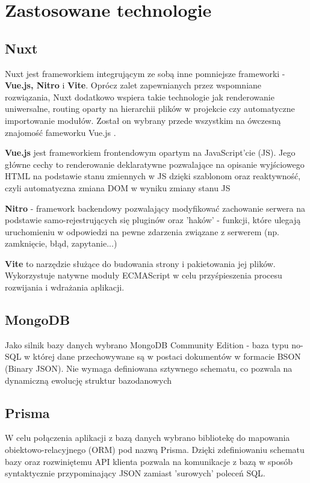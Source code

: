 \section{Zastosowane technologie}

\subsection{Nuxt}
Nuxt jest frameworkiem integrującym ze sobą inne pomniejsze frameworki - \textbf{Vue.js, Nitro} i \textbf{Vite}. 
Oprócz zalet zapewnianych przez wspomniane rozwiązania, Nuxt dodatkowo wspiera takie technologie jak 
renderowanie uniwersalne, routing oparty na hierarchii plików w projekcie czy automatyczne importowanie modułów.
Został on wybrany przede wszystkim na ówczesną znajomość fameworku Vue.js \cite{nuxt-js}.

\textbf{Vue.js} jest frameworkiem frontendowym opartym na JavaScript'cie (JS). Jego główne cechy to renderowanie deklaratywne
pozwalające na opisanie wyjściowego HTML na podstawie stanu zmiennych w JS dzięki szablonom oraz reaktywność, czyli
automatyczna zmiana DOM w wyniku zmiany stanu JS \cite{vue-js}

\textbf{Nitro} - framework backendowy pozwalający modyfikować zachowanie serwera na podstawie samo-rejestrujących się
pluginów oraz 'haków' - funkcji, które ulegają uruchomieniu w odpowiedzi na pewne zdarzenia związane z serwerem
(np. zamknięcie, błąd, zapytanie...) \cite{nitro-js}

\textbf{Vite} to narzędzie służące do budowania strony i pakietowania jej plików. Wykorzystuje natywne moduły ECMAScript
w celu przyśpieszenia procesu rozwijania i wdrażania aplikacji. \cite{vite-js}


\subsection{MongoDB}
Jako silnik bazy danych wybrano MongoDB Community Edition - baza typu no-SQL w której dane przechowywane są w postaci
dokumentów w formacie BSON (Binary JSON). Nie wymaga definiowana sztywnego schematu, co pozwala na dynamiczną ewolucję
struktur bazodanowych \cite{mongo-db}

\subsection{Prisma}
W celu połączenia aplikacji z bazą danych wybrano bibliotekę do mapowania obiektowo-relacyjnego (ORM) pod nazwą Prisma.
Dzięki zdefiniowaniu schematu bazy oraz rozwiniętemu API klienta pozwala na komunikacje z bazą w sposób syntaktycznie 
przypominający JSON zamiast 'surowych' poleceń SQL. \cite{prisma-io}

